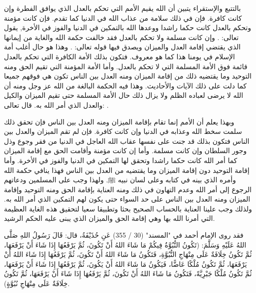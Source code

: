 بالتتبع والإستقراء يتبين أن الله يقيم الأمم التي تحكم بالعدل الذي يوافق الفطرة وإن كانت كافرة. فإن في ذلك سلامة من عذاب الله في الدنيا كما تقدم. فإن كانت مؤمنة وتحكم بالعدل كانت حكما راشدا ووعدها الله بالتمكين في الدنيا والفوز في الأخرة, يقول تعالى:
\quranayah*[24][55]{\footnotesize \surahname*[24]}.
وإن كانت مسلمة ولا تحكم بالعدل فقد خالفت حكمة الله والغاية من إيمانها الذي يقتضي إقامة العدل والميزان ويصدق فيها قوله تعالى:
\quranayah*[49][14]{\footnotesize \surahname*[49]}. وهذا هو حال أغلب أمة الإسلام في يومنا هذا كما هو معروف. فتكون بذلك الأمة الكافرة التي تحكم بالعدل قائمة فوق الأمة المسلمة التي لا تحكم بالعدل. وأما الأمة المؤمنة التي تقيم الحق ومنه التوحيد وما يقتضيه ذلك من إقامة الميزان ومنه العدل بين الناس تكون هي فوقهم جميعا كما دلت على ذلك الآيات والأحاديث. وهذا فيه الحكمة البالغة من الله عز وجل ومنه أن الله لا يرضى لعباده الظلم ولا يزال ذلك حال الأمة المسلمة حتى تقيم الميزان والكيل والعدل الذي أمر الله به. قال تعالى:
\quranayah*[13][11][12]{\footnotesize \surahname*[13]}.

وبهذا يعلم أن الأمم إنما تقام بإقامة الميزان ومنه العدل بين الناس فإن تحقق ذلك سلمت سخط الله وعذابه في الدنيا وإن كانت كافرة. فإن لم تقم الميزان والعدل بين الناس فتكون بذلك قد جنت على نفسها عقاب الله العاجل في الدنيا من فقر وجوع وذل وجور السلطان  وإن كانت مسلمة. وأما إن كانت مؤمنة وأقامت الحق مع إقامة الميزان كما أمر الله كانت حكما راشدا وتحقق لها التمكين في الدنيا والفوز في الأخرة. وأما إقامة التوحيد دون إقامة الميزان وما يقتضيه من العدل بين الناس فهذا ينافي حكمة الله وأمره الذي بينه في كتابه وعلى لسان نبيه ﷺ. ولهذا وجب على المسلمين ودعاتهم الرجوع إلى أمر الله وعدم التهاون في ذلك ومنه العناية بإقامة الحق ومنه التوحيد وإقامة الميزان ومنه العدل بين الناس على حد السواء حتى يكون لهم التمكين الذي أمر الله به. ولذلك وجب علينا العناية بالحساب الصحيح بحثا وتطبيقا سعيا لتحقيق هذه الغاية العظيمة التي أمرنا الله بها وهي إقامة الحق والميزان الذي يبنى عليه الحكم الرشيد.

فقد روى الإمام أحمد في "المسند" (30 / 355) عَنِ حُذَيْفَةُ، قال: قَالَ رَسُولُ اللهِ صَلَّى اللهُ عَلَيْهِ وَسَلَّمَ: (تَكُونُ النُّبُوَّةُ فِيكُمْ مَا شَاءَ اللهُ أَنْ تَكُونَ، ثُمَّ يَرْفَعُهَا إِذَا شَاءَ أَنْ يَرْفَعَهَا، ثُمَّ تَكُونُ خِلَافَةٌ عَلَى مِنْهَاجِ النُّبُوَّةِ، فَتَكُونُ مَا شَاءَ اللهُ أَنْ تَكُونَ، ثُمَّ يَرْفَعُهَا إِذَا شَاءَ اللهُ أَنْ يَرْفَعَهَا، ثُمَّ تَكُونُ مُلْكًا عَاضًّا، فَيَكُونُ مَا شَاءَ اللهُ أَنْ يَكُونَ، ثُمَّ يَرْفَعُهَا إِذَا شَاءَ أَنْ يَرْفَعَهَا، ثُمَّ تَكُونُ مُلْكًا جَبْرِيَّةً، فَتَكُونُ مَا شَاءَ اللهُ أَنْ تَكُونَ، ثُمَّ يَرْفَعُهَا إِذَا شَاءَ أَنْ يَرْفَعَهَا، ثُمَّ تَكُونُ خِلَافَةٌ عَلَى مِنْهَاجِ نُبُوَّةٍ).

